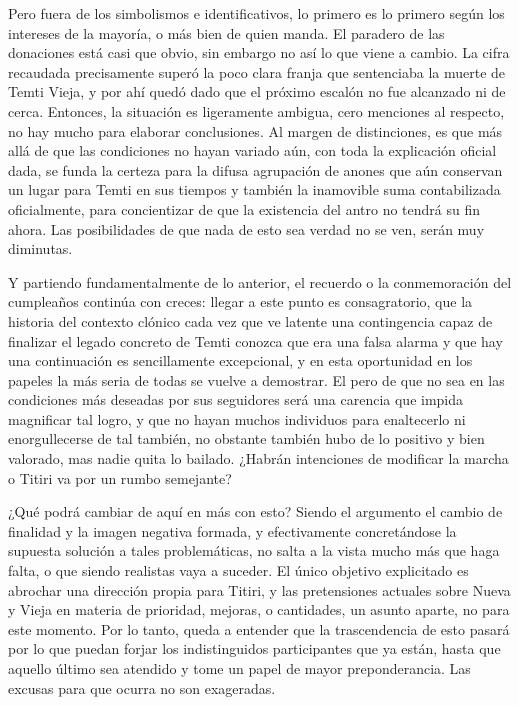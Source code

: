 \documentclass[
  spanish,
]{book}
\begin{document}
Pero fuera de los simbolismos e identificativos, lo primero es lo primero según los intereses de la mayoría, o más bien de quien manda. El paradero de las donaciones está casi que obvio, sin embargo no así lo que viene a cambio. La cifra recaudada precisamente superó la poco clara franja que sentenciaba la muerte de Temti Vieja, y por ahí quedó dado que el próximo escalón no fue alcanzado ni de cerca. Entonces, la situación es ligeramente ambigua, cero menciones al respecto, no hay mucho para elaborar conclusiones. Al margen de distinciones, es que más allá de que las condiciones no hayan variado aún, con toda la explicación oficial dada, se funda la certeza para la difusa agrupación de anones que aún conservan un lugar para Temti en sus tiempos y también la inamovible suma contabilizada oficialmente, para concientizar de que la existencia del antro no tendrá su fin ahora. Las posibilidades de que nada de esto sea verdad no se ven, serán muy diminutas.

Y partiendo fundamentalmente de lo anterior, el recuerdo o la conmemoración del cumpleaños continúa con creces: llegar a este punto es consagratorio, que la historia del contexto clónico cada vez que ve latente una contingencia capaz de finalizar el legado concreto de Temti conozca que era una falsa alarma y que hay una continuación es sencillamente excepcional, y en esta oportunidad en los papeles la más seria de todas se vuelve a demostrar. El pero de que no sea en las condiciones más deseadas por sus seguidores será una carencia que impida magnificar tal logro, y que no hayan muchos individuos para enaltecerlo ni enorgullecerse de tal también, no obstante también hubo de lo positivo y bien valorado, mas nadie quita lo bailado. ¿Habrán intenciones de modificar la marcha o Titiri va por un rumbo semejante?

¿Qué podrá cambiar de aquí en más con esto? Siendo el argumento el cambio de finalidad y la imagen negativa formada, y efectivamente concretándose la supuesta solución a tales problemáticas, no salta a la vista mucho más que haga falta, o que siendo realistas vaya a suceder. El único objetivo explicitado es abrochar una dirección propia para Titiri, y las pretensiones actuales sobre Nueva y Vieja en materia de prioridad, mejoras, o cantidades, un asunto aparte, no para este momento. Por lo tanto, queda a entender que la trascendencia de esto pasará por lo que puedan forjar los indistinguidos participantes que ya están, hasta que aquello último sea atendido y tome un papel de mayor preponderancia. Las excusas para que ocurra no son exageradas.
\end{document}
